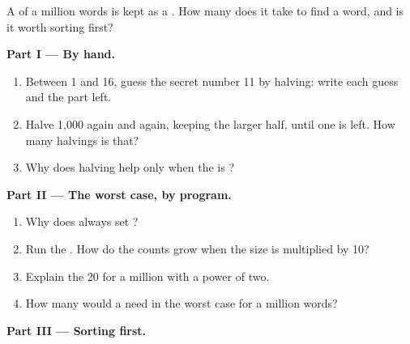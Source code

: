 \begin{problem}\label{pb:g8:searching-and-sorting:1}
A  of a million words is kept as a . How many
 does it take to find a word, and is it worth sorting first?

\medskip\noindent\textbf{Part I --- By hand.}
\begin{enumerate}
  \item Between 1 and 16, guess the secret number 11 by halving: write each
    guess and the part left.
  \item Halve 1,000 again and again, keeping the larger half, until one 
    is left. How many halvings is that?
  \item Why does halving help only when the  is ?
\end{enumerate}

\medskip\noindent\textbf{Part II --- The worst case, by program.}

\label{lst:g8:searching-and-sorting:worst}

\begin{enumerate}[resume]
  \item Why does  always set ?
  \item Run the . How do the counts grow when the size is multiplied
    by 10?
  \item Explain the 20 for a million with a power of two.
  \item How many  would a  need in the worst case for
    a million words?
\end{enumerate}

\medskip\noindent\textbf{Part III --- Sorting first.}

\label{lst:g8:searching-and-sorting:sort-or-scan}


\end{problem}

